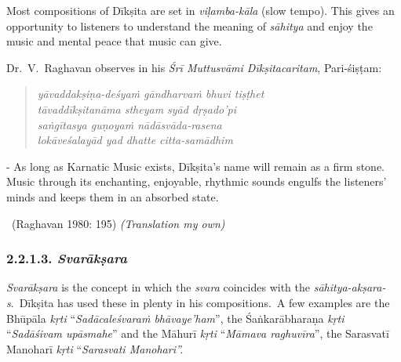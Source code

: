 Most compositions of Dīkṣita are set in \textit{viḷamba-kāla} (slow tempo). This gives an opportunity to listeners to understand the meaning of \textit{sāhitya} and enjoy the music and mental peace that music can give.

Dr.~V.~Raghavan observes in his \textit{Śrī Muttusvāmi Dīkṣitacaritam}, Pari-\break śiṣṭam:

\begin{verse}
\textit{yāvaddakṣiṇa-deśyaṁ gāndharvaṁ bhuvi tiṣṭhet} \\ \textit{tāvaddīkṣitanāma stheyam syād dṛṣado'pi} \\ \textit{saṅgītasya guṇoyaṁ nādāsvāda-rasena} \\ \textit{lokāveśalayād yad dhatte citta-samādhim} 
\end{verse}

\begin{myquote}
- As long as Karnatic Music exists, Dīkṣita’s name will remain as a firm stone. Music through its enchanting, enjoyable, rhythmic sounds engulfs the listeners’ minds and keeps them in an absorbed state. 

~\hfill (Raghavan 1980: 195) \textit{(Translation my own)}
\end{myquote}

\vspace{-.3cm}

\subsubsection*{2.2.1.3. \textit{Svarākṣara}}

\textit{Svarākṣara} is the concept in which the \textit{svara} coincides with the \textit{sāhitya-akṣara-s}.~Dīkṣita has used these in plenty in his compositions.~A few examples are the Bhūpāla \textit{kṛti} “\textit{Sadācaleśvaraṁ bhāvaye’ham}”, the Śaṅkarābharaṇa \textit{kṛti} “\textit{Sadāśivam upāsmahe}” and the Māhurī \textit{kṛti} “\textit{Māmava raghuvīra}”, the Sarasvatī Manoharī \textit{kṛti} “\textit{Sarasvati Manohari”.}


\vspace{-.3cm}

